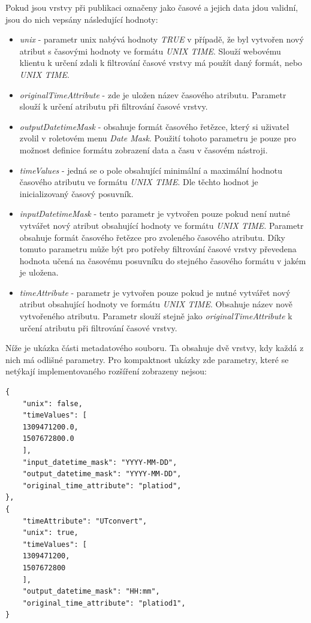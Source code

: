 Pokud jsou vrstvy při publikaci označeny jako časové a jejich data jdou validní, jsou do nich vepsány následující hodnoty:

\begin{itemize}
	\item\textit{unix} - parametr unix nabývá hodnoty \textit{TRUE} v případě, že byl vytvořen nový atribut s časovými hodnoty ve formátu \textit{UNIX TIME}. Slouží webovému klientu k určení zdali k filtrování časové vrstvy má použít daný formát, nebo \textit{UNIX TIME}.
	\item\textit{originalTimeAttribute} - zde je uložen název časového atributu. Parametr slouží k určení atributu při filtrování časové vrstvy. 
	\item\textit{outputDatetimeMask} - obsahuje formát časového řetězce, který si uživatel zvolil v roletovém menu \textit{Date Mask}. Použití tohoto parametru je pouze pro možnost definice formátu zobrazení data a času v časovém nástroji.
	\item\textit{timeValues} - jedná se o pole obsahující minimální a maximální hodnotu časového atributu ve formátu \textit{UNIX TIME}. Dle těchto hodnot je inicializovaný časový posuvník. 
	\item\textit{inputDatetimeMask} - tento parametr je vytvořen pouze pokud není nutné vytvářet nový atribut obsahující hodnoty ve formátu \textit{UNIX TIME}. Parametr obsahuje formát časového řetězce pro zvoleného časového atributu. Díky tomuto parametru může být pro potřeby filtrování časové vrstvy převedena hodnota učená na časovému posuvníku do stejného časového formátu v jakém je uložena. 
	\item\textit{timeAttribute} - parametr je vytvořen pouze pokud je nutné vytvářet nový atribut obsahující hodnoty ve formátu \textit{UNIX TIME}. Obsahuje název nově vytvořeného atributu. Parametr slouží stejně jako \textit{originalTimeAttribute} k určení atributu při filtrování časové vrstvy.  
\end{itemize}

\newpage
\bigskip
\noindent

Níže je ukázka části metadatového souboru. Ta obsahuje dvě vrstvy, kdy každá z nich má odlišné parametry. Pro kompaktnost ukázky zde parametry, které se netýkají implementovaného rozšíření zobrazeny nejsou: 

\begin{verbatim}
{
	"unix": false, 
	"timeValues": [
	1309471200.0, 
	1507672800.0
	], 
	"input_datetime_mask": "YYYY-MM-DD", 
	"output_datetime_mask": "YYYY-MM-DD", 
	"original_time_attribute": "platiod", 
}, 
{
	"timeAttribute": "UTconvert", 
	"unix": true, 
	"timeValues": [
	1309471200, 
	1507672800
	], 
	"output_datetime_mask": "HH:mm", 
	"original_time_attribute": "platiod1", 
}
\end{verbatim}

